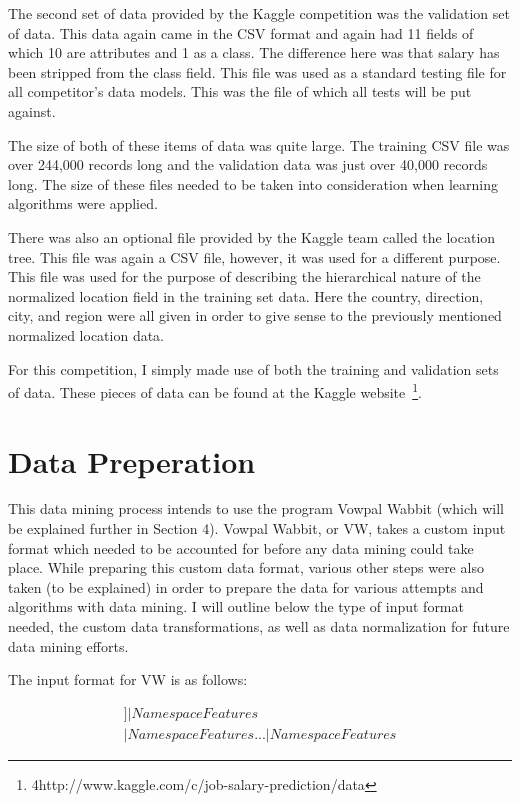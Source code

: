 \documentclass[conference]{IEEEtran}
\begin{document}
The second set of data provided by the Kaggle competition was the validation set
of data. This data again came in the CSV format and again had 11 fields of
which 10 are attributes and 1 as a class. The difference here was that salary has
been stripped from the class field. This file was used as a standard testing file for
all competitor's data models. This was the file of which all tests will be put against.

The size of both of these items of data was quite large. The training CSV file
was over 244,000 records long and the validation data was just over 40,000 records
long. The size of these files needed to be taken into consideration when learning algorithms were applied.

There was also an optional file provided by the Kaggle team called the location
tree. This file was again a CSV file, however, it was used for a different purpose.
This file was used for the purpose of describing the hierarchical nature of the
normalized location field in the training set data. Here the country, direction,
city, and region were all given in order to give sense to the previously mentioned
normalized location data.

For this competition, I simply made use of both the training and validation
sets of data. These pieces of data can be found at the Kaggle
website~\footnote{4http://www.kaggle.com/c/job-salary-prediction/data}.

\section{Data Preperation}

This data mining process intends to use the program Vowpal Wabbit (which
will be explained further in Section 4). Vowpal Wabbit, or VW, takes a custom
input format which needed to be accounted for before any data mining could
take place. While preparing this custom data format, various other steps were
also taken (to be explained) in order to prepare the data for various attempts
and algorithms with data mining. I will outline below the type of input format 
needed, the custom data transformations, as well as data normalization for
future data mining efforts.

The input format for VW is as follows:

\begin{multline}
[Label][Importance[Tag]]|NamespaceFeatures \\ |NamespaceFeatures...|NamespaceFeatures
\end{multline}
\end{document}
